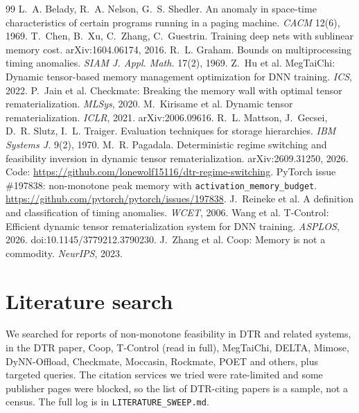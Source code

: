 \documentclass[11pt]{article}
\begin{document}
\begin{thebibliography}{99}\small
{} L.~A. Belady, R.~A. Nelson, G.~S. Shedler. An anomaly in space-time
characteristics of certain programs running in a paging machine. \emph{CACM} 12(6), 1969.
 T.~Chen, B.~Xu, C.~Zhang, C.~Guestrin. Training deep nets with sublinear
memory cost. arXiv:1604.06174, 2016.
 R.~L. Graham. Bounds on multiprocessing timing anomalies. \emph{SIAM J.
Appl. Math.} 17(2), 1969.
 Z.~Hu et al. MegTaiChi: Dynamic tensor-based memory management
optimization for DNN training. \emph{ICS}, 2022.
 P.~Jain et al. Checkmate: Breaking the memory wall with optimal
tensor rematerialization. \emph{MLSys}, 2020.
 M.~Kirisame et al. Dynamic tensor rematerialization. \emph{ICLR},
2021. arXiv:2006.09616.
 R.~L. Mattson, J.~Gecsei, D.~R. Slutz, I.~L. Traiger. Evaluation
techniques for storage hierarchies. \emph{IBM Systems J.} 9(2), 1970.
 M.~R. Pagadala. Deterministic regime switching and feasibility
inversion in dynamic tensor rematerialization. arXiv:2609.31250, 2026.
Code: \url{https://github.com/lonewolf15116/dtr-regime-switching}.
 PyTorch issue \#197838: non-monotone peak memory with
\texttt{activation\_memory\_budget}. \url{https://github.com/pytorch/pytorch/issues/197838}.
 J.~Reineke et al. A definition and classification of timing anomalies.
\emph{WCET}, 2006.
 Wang et al. T-Control: Efficient dynamic tensor rematerialization
system for DNN training. \emph{ASPLOS}, 2026. doi:10.1145/3779212.3790230.
 J.~Zhang et al. Coop: Memory is not a commodity. \emph{NeurIPS}, 2023.
\end{thebibliography}

\appendix
\section{Literature search}\label{app:lit}
We searched for reports of non-monotone feasibility in DTR and related systems, in the DTR
paper, Coop, T-Control (read in full), MegTaiChi, DELTA, Mimose, DyNN-Offload, Checkmate,
Moccasin, Rockmate, POET and others, plus targeted queries. The citation services we tried
were rate-limited and some publisher pages were blocked, so the list of DTR-citing papers is
a sample, not a census. The full log is in \texttt{LITERATURE\_SWEEP.md}.
\end{document}
